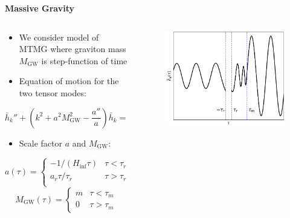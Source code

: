 \documentclass{beamer}                             %
\newcommand{\blocktitle}[1]{{\Large \textbf{#1}}}
\begin{document}
\begin{frame}[t]
\begin{columns}[T]
\begin{column}{0.30\textwidth}
  \begin{tcolorbox}
    \blocktitle{Massive Gravity}
    \vspace{0.25\baselineskip}
    \begin{columns}
      \hfill
      \begin{column}{0.5\textwidth}
      \begin{itemize}
          \item  We consider model of MTMG \cite{DeFelice:2015hla} where graviton mass $M_{\text{GW}}$ is step-function of time \cite{Fujita:2018ehq}
          \item Equation of motion for the two tensor modes:
      \end{itemize} 
      $$\bar{h}_k'' + \left(k^2 + a^2 M_\text{GW}^2 - \frac{a''}{a}\right)\bar{h}_k = 0 $$  
    \begin{itemize}
        \item Scale factor $a$ and $M_{\text{GW}}$:
    \end{itemize}
        $$a(\tau) = 
    \begin{cases}
        -1/(H_{\inf}\tau) & \tau < \tau_r \\
        a_r \tau/\tau_r & \tau > \tau_r \\
   \end{cases} $$
    $$M_\text{GW}(\tau) = 
    \begin{cases}
        m & \tau < \tau_m \\
        0 & \tau > \tau_m
   \end{cases}$$
      \end{column}
      \begin{column}{0.48\textwidth}
        \begin{figure}[t]
          \centering
          \includegraphics[width=\linewidth]{fig1.pdf} 
          \label{fig:mode}
        \end{figure}
      \end{column}
    \end{columns}
  \end{tcolorbox}
\end{column}


\end{columns}
\end{frame}
\end{document}
